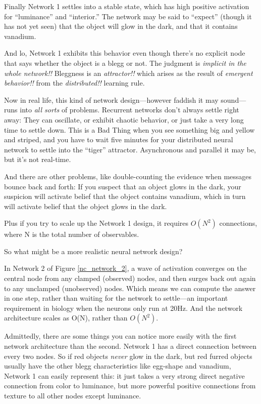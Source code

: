 { Finally Network 1 settles into a stable state, which has high
positive activation for
``luminance'' and
``interior.'' The network may be
said to ``expect'' (though it has
not yet seen) that the object will glow in the dark, and that it
contains vanadium.


 And lo, Network 1 exhibits this behavior even though
there's no explicit node that says whether the object
is a blegg or not. The judgment is \textit{implicit in the whole
network!!} Bleggness is an \textit{attractor!!} which arises as the
result of \textit{emergent behavior!!} from the \textit{distributed!!}
learning rule.


 Now in real life, this kind of network design---however faddish it
may sound---runs into \textit{all sorts} of problems. Recurrent
networks don't always settle right away: They can
oscillate, or exhibit chaotic behavior, or just take a very long time
to settle down. This is a Bad Thing when you see something big and
yellow and striped, and you have to wait five minutes for your
distributed neural network to settle into the
``tiger'' attractor. Asynchronous
and parallel it may be, but it's not real-time.


 And there are other problems, like double-counting the evidence
when messages bounce back and forth: If you suspect that an object
glows in the dark, your suspicion will activate belief that the object
contains vanadium, which in turn will activate belief that the object
glows in the dark.


 Plus if you try to scale up the Network 1 design, it requires
$O(N^{2})$ connections, where N is the total number of
observables.


 So what might be a more realistic neural network design?



 In Network 2 of Figure \ref{nc_network_2}, a wave of activation converges on
the central node from any clamped (observed) nodes, and then surges
back out again to any unclamped (unobserved) nodes. Which means we can
compute the answer in one step, rather than waiting for the network to
settle---an important requirement in biology when the neurons only run
at 20Hz. And the network architecture scales as O(N), rather than
$O(N^{2})$.


 Admittedly, there are some things you can notice more easily with
the first network architecture than the second. Network 1 has a direct
connection between every two nodes. So if red objects \textit{never}
glow in the dark, but red furred objects usually have the other blegg
characteristics like egg-shape and vanadium, Network 1 can easily
represent this: it just takes a very strong direct negative connection
from color to luminance, but more powerful positive connections from
texture to all other nodes except luminance.


}

